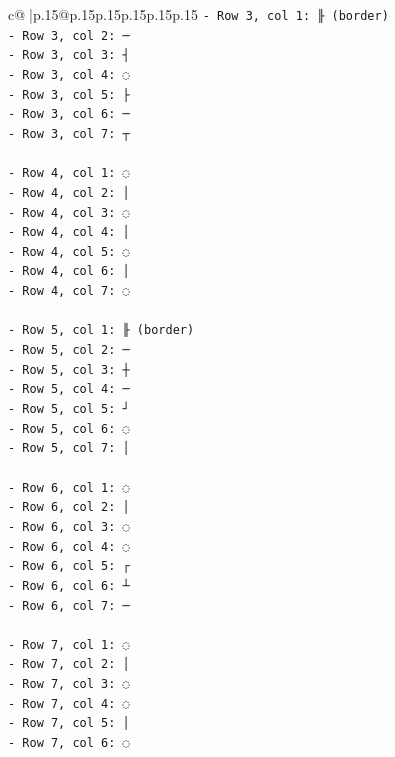 \documentclass{article}
\begin{document}
{\begin{supertabular}{c@{$\;$}|p{.15\linewidth}@{}p{.15\linewidth}p{.15\linewidth}p{.15\linewidth}p{.15\linewidth}p{.15\linewidth}}
{{{\texttt{{-} Row 3, col 1: ╟ (border)} \\
\texttt{{-} Row 3, col 2: ─} \\
\texttt{{-} Row 3, col 3: ┤} \\
\texttt{{-} Row 3, col 4: ◌} \\
\texttt{{-} Row 3, col 5: ├} \\
\texttt{{-} Row 3, col 6: ─} \\
\texttt{{-} Row 3, col 7: ┬} \\
\\ 
\texttt{{-} Row 4, col 1: ◌} \\
\texttt{{-} Row 4, col 2: │} \\
\texttt{{-} Row 4, col 3: ◌} \\
\texttt{{-} Row 4, col 4: │} \\
\texttt{{-} Row 4, col 5: ◌} \\
\texttt{{-} Row 4, col 6: │} \\
\texttt{{-} Row 4, col 7: ◌} \\
\\ 
\texttt{{-} Row 5, col 1: ╟ (border)} \\
\texttt{{-} Row 5, col 2: ─} \\
\texttt{{-} Row 5, col 3: ┼} \\
\texttt{{-} Row 5, col 4: ─} \\
\texttt{{-} Row 5, col 5: ┘} \\
\texttt{{-} Row 5, col 6: ◌} \\
\texttt{{-} Row 5, col 7: │} \\
\\ 
\texttt{{-} Row 6, col 1: ◌} \\
\texttt{{-} Row 6, col 2: │} \\
\texttt{{-} Row 6, col 3: ◌} \\
\texttt{{-} Row 6, col 4: ◌} \\
\texttt{{-} Row 6, col 5: ┌} \\
\texttt{{-} Row 6, col 6: ┴} \\
\texttt{{-} Row 6, col 7: ─} \\
\\ 
\texttt{{-} Row 7, col 1: ◌} \\
\texttt{{-} Row 7, col 2: │} \\
\texttt{{-} Row 7, col 3: ◌} \\
\texttt{{-} Row 7, col 4: ◌} \\
\texttt{{-} Row 7, col 5: │} \\
\texttt{{-} Row 7, col 6: ◌} \\
}}}
\end{supertabular}}
\end{document}

